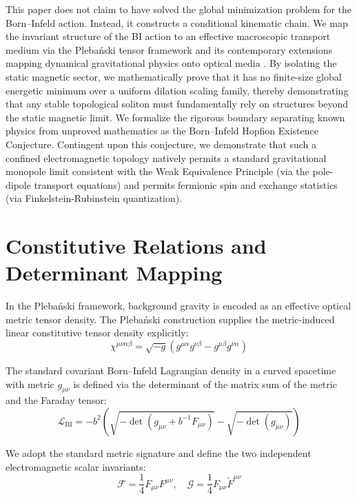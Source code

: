 \documentclass[11pt,a4paper]{article}
\begin{document}
This paper does not claim to have solved the global minimization problem for the Born--Infeld action. Instead, it constructs a conditional kinematic chain. We map the invariant structure of the BI action to an effective macroscopic transport medium via the Pleba\'{n}ski tensor framework and its contemporary extensions mapping dynamical gravitational physics onto optical media \cite{Plebanski1960, Erkul2026}. By isolating the static magnetic sector, we mathematically prove that it has no finite-size global energetic minimum over a uniform dilation scaling family, thereby demonstrating that any stable topological soliton must fundamentally rely on structures beyond the static magnetic limit. We formalize the rigorous boundary separating known physics from unproved mathematics as the Born--Infeld Hopfion Existence Conjecture. Contingent upon this conjecture, we demonstrate that such a confined electromagnetic topology natively permits a standard gravitational monopole limit consistent with the Weak Equivalence Principle (via the pole-dipole transport equations) and permits fermionic spin and exchange statistics (via Finkelstein-Rubinstein quantization).

\section{Constitutive Relations and Determinant Mapping}
In the Pleba\'{n}ski framework, background gravity is encoded as an effective optical metric tensor density. The Pleba\'{n}ski construction supplies the metric-induced linear constitutive tensor density explicitly:
\begin{equation}
\chi^{\mu\nu\alpha\beta} = \sqrt{-g} \left(g^{\mu\alpha}g^{\nu\beta} - g^{\mu\beta}g^{\nu\alpha}\right)
\end{equation}

The standard covariant Born--Infeld Lagrangian density in a curved spacetime with metric $g_{\mu\nu}$ is defined via the determinant of the matrix sum of the metric and the Faraday tensor:
\begin{equation}
\mathcal{L}_{\text{BI}} = -b^2 \left(\sqrt{-\det(g_{\mu\nu} + b^{-1}F_{\mu\nu})} - \sqrt{-\det(g_{\mu\nu})}\right)
\end{equation}

We adopt the standard metric signature and define the two independent electromagnetic scalar invariants:
\begin{equation}
\mathcal{F} = \frac{1}{4} F_{\mu\nu}F^{\mu\nu}, \quad \mathcal{G} = \frac{1}{4} F_{\mu\nu}\tilde{F}^{\mu\nu}
\end{equation}
\end{document}
